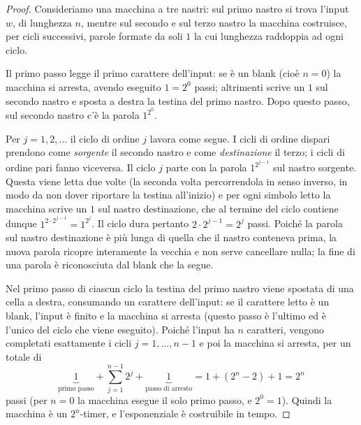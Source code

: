 \begin{proof}
Consideriamo una macchina a tre nastri: sul primo nastro si trova l'input $w$, di lunghezza $n$, mentre sul secondo e sul terzo nastro la macchina costruisce, per cicli successivi, parole formate da soli $1$ la cui lunghezza raddoppia ad ogni ciclo.

Il primo passo legge il primo carattere dell'input: se è un blank (cioè $n=0$) la macchina si arresta, avendo eseguito $1=2^0$ passi; altrimenti scrive un $1$ sul secondo nastro e sposta a destra la testina del primo nastro. Dopo questo passo, sul secondo nastro c'è la parola $1^{2^0}$.

Per $j=1,2,\dots$ il ciclo di ordine $j$ lavora come segue. I cicli di ordine dispari prendono come \emph{sorgente} il secondo nastro e come \emph{destinazione} il terzo; i cicli di ordine pari fanno viceversa. Il ciclo $j$ parte con la parola $1^{2^{j-1}}$ sul nastro sorgente. Questa viene letta due volte (la seconda volta percorrendola in senso inverso, in modo da non dover riportare la testina all'inizio) e per ogni simbolo letto la macchina scrive un $1$ sul nastro destinazione, che al termine del ciclo contiene dunque $1^{2\cdot 2^{j-1}}=1^{2^j}$. Il ciclo dura pertanto $2\cdot 2^{j-1}=2^j$ passi. Poiché la parola sul nastro destinazione è più lunga di quella che il nastro conteneva prima, la nuova parola ricopre interamente la vecchia e non serve cancellare nulla; la fine di una parola è riconosciuta dal blank che la segue.

Nel primo passo di ciascun ciclo la testina del primo nastro viene spostata di una cella a destra, consumando un carattere dell'input: se il carattere letto è un blank, l'input è finito e la macchina si arresta (questo passo è l'ultimo ed è l'unico del ciclo che viene eseguito). Poiché l'input ha $n$ caratteri, vengono completati esattamente i cicli $j=1,\dots,n-1$ e poi la macchina si arresta, per un totale di
\[
\underbrace{1}_{\text{primo passo}}+\sum_{j=1}^{n-1}2^j+\underbrace{1}_{\text{passo di arresto}}=1+(2^n-2)+1=2^n
\]
passi (per $n=0$ la macchina esegue il solo primo passo, e $2^0=1$). Quindi la macchina è un $2^n$-timer, e l'esponenziale è costruibile in tempo.
\end{proof}

